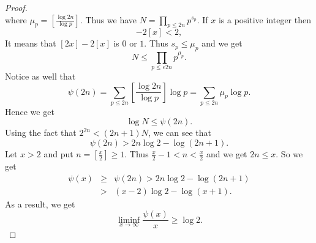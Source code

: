 \documentclass[12pt,letterpaper]{book}
\begin{document}
\begin{proof}
\begin{equation*}
\end{equation*}
where $\mu_p=\left[\frac{\log 2n}{\log p}\right]$. Thus we have
$N=\prod_{p\leq 2n}p^{s_p}$. If $x$ is a positive integer then
\begin{equation*}
[2x]-2[x]<2,
\end{equation*}
It means that $[2x]-2[x]$ is $0$ or $1$.  Thus $s_p\leq \mu_p$ and
we get
\begin{equation*}
N\leq \prod_{p\leq e2n}p^{\mu_p}.
\end{equation*}
Notice as well that
\begin{equation*}
\psi(2n)=\sum_{p\leq 2n}\left[\frac{\log 2n}{\log p}\right]\log
p=\sum_{p\leq 2n}\mu_p \log p.
\end{equation*}
Hence we get
\begin{equation*}
\log N \leq \psi(2n).
\end{equation*}
Using the fact that $2^{2n}<(2n+1)N$, we can see that
\begin{equation*}
\psi(2n)>2n \log 2-\log (2n+1).
\end{equation*}
Let $x>2$ and put $n=\left[\frac{x}{2}\right]\geq 1$.  Thus
$\frac{x}{2}-1<n<\frac{x}{2}$ and we get $2n \leq x$. So we get
\begin{eqnarray*}
\psi(x)&\geq &\psi(2n)>2n \log 2- \log (2n+1)\\&>&(x-2)\log 2- \log
(x+1).
\end{eqnarray*}
As a result, we get
\begin{equation*}
\liminf_{x\rightarrow \infty}\frac{\psi(x)}{x}\geq \log 2.
\end{equation*}
\end{proof}
\end{document}
